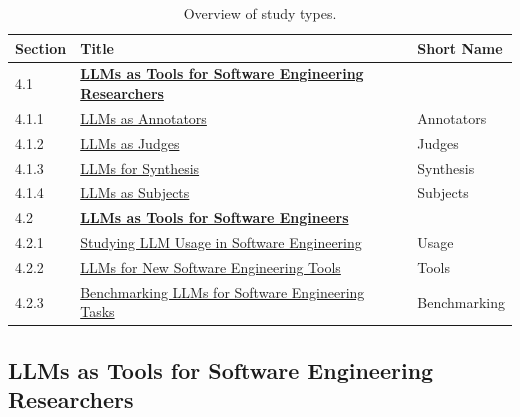 \begin{table}[tb]
\centering
\caption{Overview of study types.}
\label{tab:study-types}
\begin{tabular}{@{}lll@{}}
\toprule
\textbf{Section} & \textbf{Title} & \textbf{Short Name} \\
\midrule
4.1   & \textbf{\hyperref[sec:llms-as-tools-for-software-engineering-researchers]{LLMs as Tools for Software Engineering Researchers}}                 &            \\
4.1.1 & \quad \hyperref[sec:llms-as-annotators]{LLMs as Annotators}                                                                                  & Annotators \\
4.1.2 & \quad \hyperref[sec:llms-as-judges]{LLMs as Judges}                                                                                          & Judges     \\
4.1.3 & \quad \hyperref[sec:llms-for-synthesis]{LLMs for Synthesis}                                                                                  & Synthesis  \\
4.1.4 & \quad \hyperref[sec:llms-as-subjects]{LLMs as Subjects}                                                                                      & Subjects   \\
\midrule
4.2   & \textbf{\hyperref[sec:llms-as-tools-for-software-engineers]{LLMs as Tools for Software Engineers}}                                           &            \\
4.2.1 & \quad \hyperref[sec:studying-llm-usage-in-software-engineering]{Studying LLM Usage in Software Engineering}                                  & Usage      \\
4.2.2 & \quad \hyperref[sec:llms-for-new-software-engineering-tools]{LLMs for New Software Engineering Tools}                                        & Tools      \\
4.2.3 & \quad \hyperref[sec:benchmarking-llms-for-software-engineering-tasks]{Benchmarking LLMs for Software Engineering Tasks}                      & Benchmarking \\
\bottomrule
\end{tabular}
\end{table}

\subsection{LLMs as Tools for Software Engineering Researchers}
\label{sec:llms-as-tools-for-software-engineering-researchers}

